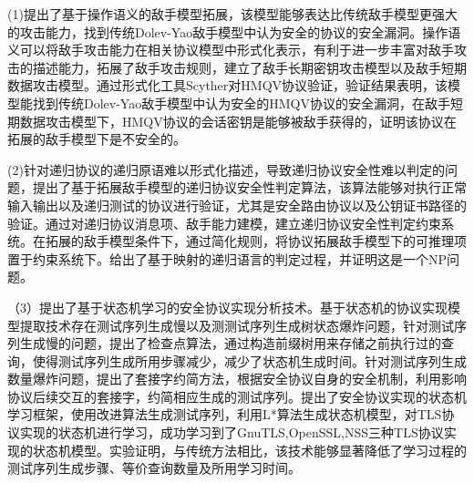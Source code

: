 \begin{cabstract}

(1)提出了基于操作语义的敌手模型拓展，该模型能够表达比传统敌手模型更强大的攻击能力，找到传统Dolev-Yao敌手模型中认为安全的协议的安全漏洞。操作语义可以将敌手攻击能力在相关协议模型中形式化表示，有利于进一步丰富对敌手攻击的描述能力，拓展了敌手攻击规则，建立了敌手长期密钥攻击模型以及敌手短期数据攻击模型。通过形式化工具Scyther对HMQV协议验证，验证结果表明，该模型能找到传统Dolev-Yao敌手模型中认为安全的HMQV协议的安全漏洞，在敌手短期数据攻击模型下，HMQV协议的会话密钥是能够被敌手获得的，证明该协议在拓展的敌手模型下是不安全的。

(2)针对递归协议的递归原语难以形式化描述，导致递归协议安全性难以判定的问题，提出了基于拓展敌手模型的递归协议安全性判定算法，该算法能够对执行正常输入输出以及递归测试的协议进行验证，尤其是安全路由协议以及公钥证书路径的验证。通过对递归协议消息项、敌手能力建模，建立递归协议安全性判定约束系统。在拓展的敌手模型条件下，通过简化规则，将协议拓展敌手模型下的可推理项置于约束系统下。给出了基于映射的递归语言的判定过程，并证明这是一个NP问题。


（3）提出了基于状态机学习的安全协议实现分析技术。基于状态机的协议实现模型提取技术存在测试序列生成慢以及测测试序列生成树状态爆炸问题，针对测试序列生成慢的问题，提出了检查点算法，通过构造前缀树用来存储之前执行过的查询，使得测试序列生成所用步骤减少，减少了状态机生成时间。针对测试序列生成数量爆炸问题，提出了套接字约简方法，根据安全协议自身的安全机制，利用影响协议后续交互的套接字，约简相应生成的测试序列。提出了安全协议实现的状态机学习框架，使用改进算法生成测试序列，利用L*算法生成状态机模型，对TLS协议实现的状态机进行学习，成功学习到了GnuTLS,OpenSSL,NSS三种TLS协议实现的状态机模型。实验证明，与传统方法相比，该技术能够显著降低了学习过程的测试序列生成步骤、等价查询数量及所用学习时间。



\end{cabstract}
